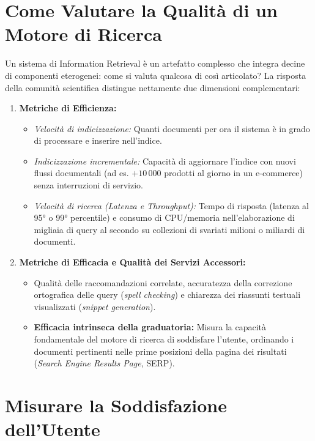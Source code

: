 \FloatBarrier
\section{Come Valutare la Qualità di un Motore di Ricerca}

Un sistema di Information Retrieval è un artefatto complesso che integra decine di componenti eterogenei: come si valuta qualcosa di così articolato? La risposta della comunità scientifica distingue nettamente due dimensioni complementari:

\begin{enumerate}
    \item \textbf{Metriche di Efficienza:}
    \begin{itemize}
        \item \textit{Velocità di indicizzazione:} Quanti documenti per ora il sistema è in grado di processare e inserire nell'indice.
        \item \textit{Indicizzazione incrementale:} Capacità di aggiornare l'indice con nuovi flussi documentali (ad es. $+10\,000$ prodotti al giorno in un e-commerce) senza interruzioni di servizio.
        \item \textit{Velocità di ricerca (Latenza e Throughput):} Tempo di risposta (latenza al 95° o 99° percentile) e consumo di CPU/memoria nell'elaborazione di migliaia di query al secondo su collezioni di svariati milioni o miliardi di documenti.
    \end{itemize}
    \item \textbf{Metriche di Efficacia e Qualità dei Servizi Accessori:}
    \begin{itemize}
        \item Qualità delle raccomandazioni correlate, accuratezza della correzione ortografica delle query (\textit{spell checking}) e chiarezza dei riassunti testuali visualizzati (\textit{snippet generation}).
        \item \textbf{Efficacia intrinseca della graduatoria:} Misura la capacità fondamentale del motore di ricerca di soddisfare l'utente, ordinando i documenti pertinenti nelle prime posizioni della pagina dei risultati (\textit{Search Engine Results Page}, SERP).
    \end{itemize}
\end{enumerate}

\FloatBarrier
\section{Misurare la Soddisfazione dell'Utente}

